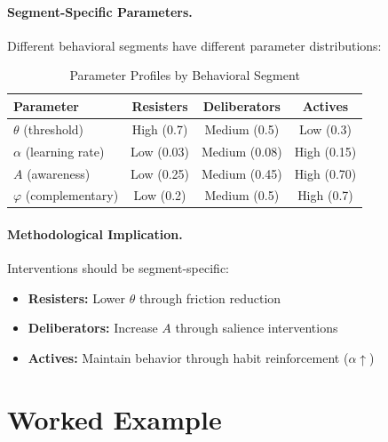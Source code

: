 \paragraph{Segment-Specific Parameters.}
Different behavioral segments have different parameter distributions:

\begin{table}[htbp]
\centering
\caption{Parameter Profiles by Behavioral Segment}
\label{tab:az-segments}
\renewcommand{\arraystretch}{1.2}
\begin{tabular}{@{}lccc@{}}
\toprule
\textbf{Parameter} & \textbf{Resisters} & \textbf{Deliberators} & \textbf{Actives} \\
\midrule
$\theta$ (threshold) & High (0.7) & Medium (0.5) & Low (0.3) \\
$\alpha$ (learning rate) & Low (0.03) & Medium (0.08) & High (0.15) \\
$A$ (awareness) & Low (0.25) & Medium (0.45) & High (0.70) \\
$\varphi$ (complementary) & Low (0.2) & Medium (0.5) & High (0.7) \\
\bottomrule
\end{tabular}
\end{table}

\paragraph{Methodological Implication.}
Interventions should be segment-specific:
\begin{itemize}
\item \textbf{Resisters:} Lower $\theta$ through friction reduction
\item \textbf{Deliberators:} Increase $A$ through salience interventions
\item \textbf{Actives:} Maintain behavior through habit reinforcement ($\alpha \uparrow$)
\end{itemize}



\section{Worked Example}
\label{sec:az-example}

